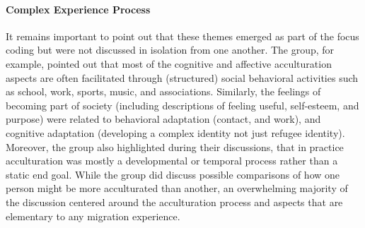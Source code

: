 \documentclass[nobib]{tufte-handout}
\begin{document}
\paragraph{Complex Experience Process} It remains important to point out that these themes emerged as part of the focus coding but were not discussed in isolation from one another. The group, for example, pointed out that most of the cognitive and affective acculturation aspects are often facilitated through (structured) social behavioral activities such as school, work, sports, music, and associations. Similarly, the feelings of becoming part of society (including descriptions of feeling useful, self-esteem, and purpose) were related to behavioral adaptation (contact, and work), and cognitive adaptation (developing a complex identity not just refugee identity). Moreover, the group also highlighted during their discussions, that in practice acculturation was mostly a developmental or temporal process rather than a static end goal. While the group did discuss possible comparisons of how one person might be more acculturated than another, an overwhelming majority of the discussion centered around the acculturation process and aspects that are elementary to any migration experience.
\end{document}
